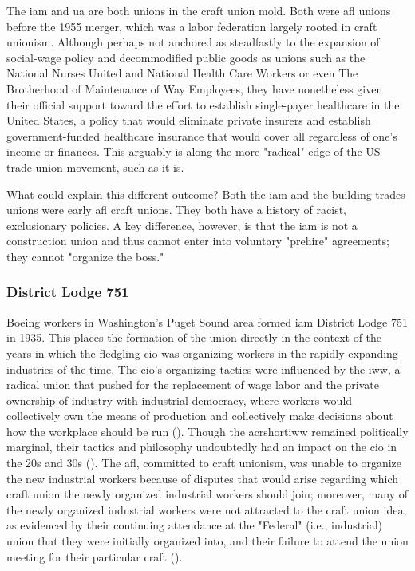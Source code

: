 \documentclass[12pt]{article}
\begin{document}
The \acrfull{iam} and \acrshort{ua} are both unions in the craft union mold. Both were \acrfull{afl} unions before the 1955 merger, which was a labor federation largely rooted in craft unionism. Although perhaps not anchored as steadfastly to the expansion of social-wage policy and decommodified public goods as unions such as the National Nurses United and National Health Care Workers or even The Brotherhood of Maintenance of Way Employees, they have nonetheless given their official support toward the effort to establish single-payer healthcare in the United States, a policy that would eliminate private insurers and establish government-funded healthcare insurance that would cover all regardless of one's income or finances. This arguably is along the more "radical" edge of the US trade union movement, such as it is.

What could explain this different outcome? Both the \acrshort{iam} and the building trades unions were early \acrshort{afl} craft unions. They both have a history of racist, exclusionary policies. A key difference, however, is that the \acrshort{iam} is not a construction union and thus cannot enter into voluntary "prehire" agreements; they cannot "organize the boss."

\subsubsection{District Lodge 751}
Boeing workers in Washington's Puget Sound area formed \acrshort{iam} District Lodge 751 in 1935. This places the formation of the union directly in the context of the years in which the fledgling \acrshort{cio} was organizing workers in the rapidly expanding industries of the time. The \acrshort{cio}'s organizing tactics were influenced by the \acrfull{iww}, a radical union that pushed for the replacement of wage labor and the private ownership of industry with industrial democracy, where workers would collectively own the means of production and collectively make decisions about how the workplace should be run (\cite{industrialworkersoftheworldIWW}). Though the acrshort{iww} remained politically marginal, their tactics and philosophy undoubtedly had an impact on the \acrshort{cio} in the 20s and 30s (\cite[2-6]{mccannBloodWaterHistory1989}). The \acrshort{afl}, committed to craft unionism, was unable to organize the new industrial workers because of disputes that would arise regarding which craft union the newly organized industrial workers should join; moreover, many of the newly organized industrial workers were not attracted to the craft union idea, as evidenced by their continuing attendance at the "Federal" (i.e., industrial) union that they were initially organized into, and their failure to attend the union meeting for their particular craft (\cite[8]{mccannBloodWaterHistory1989}). 
\end{document}
